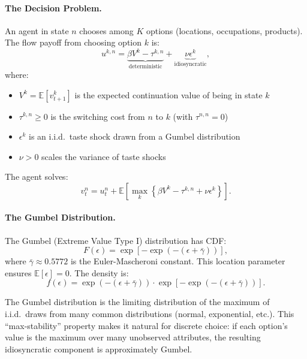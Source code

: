 \paragraph{The Decision Problem.}

An agent in state $n$ chooses among $K$ options (locations, occupations, products). The flow payoff from choosing option $k$ is:
\begin{equation}
\label{eq:payoff-gumbel}
u^{k,n} = \underbrace{\beta V^k - \tau^{k,n}}_{\text{deterministic}} + \underbrace{\nu \epsilon^k}_{\text{idiosyncratic}},
\end{equation}
where:
\begin{itemize}[nosep]
    \item $V^k = \mathbb{E}[v_{t+1}^k]$ is the expected continuation value of being in state $k$
    \item $\tau^{k,n} \geq 0$ is the switching cost from $n$ to $k$ (with $\tau^{n,n} = 0$)
    \item $\epsilon^k$ is an i.i.d.\ taste shock drawn from a Gumbel distribution
    \item $\nu > 0$ scales the variance of taste shocks
\end{itemize}

The agent solves:
\begin{equation}
\label{eq:bellman-gumbel}
v_t^n = u_t^n + \mathbb{E}\left[ \max_k \left\{ \beta V^k - \tau^{k,n} + \nu \epsilon^k \right\} \right].
\end{equation}

\paragraph{The Gumbel Distribution.}

The Gumbel (Extreme Value Type I) distribution has CDF:
\begin{equation}
F(\epsilon) = \exp\left[ -\exp\left( -(\epsilon + \bar{\gamma}) \right) \right],
\end{equation}
where $\bar{\gamma} \approx 0.5772$ is the Euler-Mascheroni constant. This location parameter ensures $\mathbb{E}[\epsilon] = 0$. The density is:
\begin{equation}
f(\epsilon) = \exp\left( -(\epsilon + \bar{\gamma}) \right) \cdot \exp\left[ -\exp\left( -(\epsilon + \bar{\gamma}) \right) \right].
\end{equation}

\begin{calloutnote}
The Gumbel distribution is the limiting distribution of the maximum of i.i.d.\ draws from many common distributions (normal, exponential, etc.). This ``max-stability'' property makes it natural for discrete choice: if each option's value is the maximum over many unobserved attributes, the resulting idiosyncratic component is approximately Gumbel.
\end{calloutnote}

